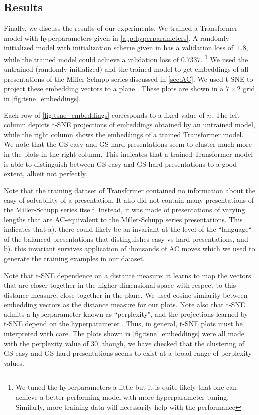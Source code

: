 \subsection{Results\label{sec:transformer_results}}
Finally, we discuss the results of our experiments. We trained a Transformer model with hyperparameters given in  \autoref{app:hyperparameters}. A randomly initialized model with initialization scheme given in \cite{Radford2019LanguageMA} has a validation loss of $~1.8$, while the trained model could achieve a validation loss of $0.7337$.
\footnote{We tuned the hyperparameters a little but it is quite likely that one can achieve a better performing model with more hyperparameter tuning. Similarly, more training data will necessarily help with the performance}
We used the untrained (randomly initialized) and the trained model to get embeddings of all presentations of the Miller-Schupp series discussed in \autoref{sec:AC}. We used t-SNE to project these embedding vectors to a plane \cite{JMLR:v9:vandermaaten08a}. These plots are shown in a $7 \times 2$ grid in \autoref{fig:tsne_embeddings}.

Each row of \autoref{fig:tsne_embeddings} corresponds to a fixed value of $n$. The left column depicts t-SNE projections of embeddings obtained by an untrained model, while the right column shows the embeddings of a trained Transformer model. We note that the GS-easy and GS-hard presentations seem to cluster much more in the plots in the right column. This indicates that a trained Transformer model is able to distinguish between GS-easy and GS-hard presentations to a good extent, albeit not perfectly. 

Note that the training dataset of Transformer contained no information about the easy of solvability of a presentation. It also did not contain many presentations of the Miller-Schupp series itself. Instead, it was made of presentations of varying lengths that are AC-equivalent to the Miller-Schupp series presentations. This indicates that a). there could likely be an invariant at the level of the ``language`` of the balanced presentations that distinguishes easy vs hard presentations, and b). this invariant survives application of thousands of AC moves which we used to generate the 
training examples in our dataset. 

 Note that t-SNE dependence on a distance measure: it learns to map the vectors that are closer together in the higher-dimensional space with respect to this distance measure, close together in the plane. We used cosine simiarity between embedding vectors as the distance measure for our plots. Note also that t-SNE admits a hyperparameter known as ``perplexity", and the projections learned by t-SNE depend on the hyperparameter \cite{wattenberg2016how}. Thus, in general, t-SNE plots must be interpreted with care. The plots shown in \autoref{fig:tsne_embeddings} were all made with the perplexity value of $30$, though, we have checked that the clustering of GS-easy and GS-hard presentations seems to exist at a broad range of perplexity values.




